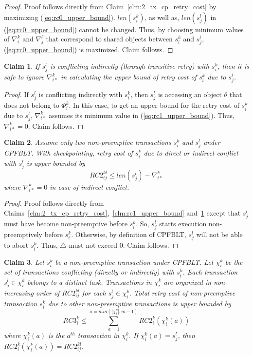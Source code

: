 \documentclass[preprint]{sigplanconf}
\newtheorem{clm}{Claim}
\begin{document}
%
\begin{proof}
%
Proof follows directly from Claim~\ref{clm:2_tx_cp_retry_cost} by maximizing (\ref{eq:rc0_upper_bound}). $len\left(s_i^k\right)$, as well as, $len\left(s_j^l\right)$ in (\ref{eq:rc0_upper_bound}) cannot be changed. Thus, by choosing minimum values of $\nabla_i^k$ and $\nabla_j^l$ that correspond to shared objects between $s_i^k$ and $s_j^l$, (\ref{eq:rc0_upper_bound}) is maximized. Claim follows.
%
\end{proof}
%
\begin{clm}\label{clm:cp_with_transitive_retry}
If $s_j^l$ is conflicting indirectly (through transitive retry) with $s_i^k$, then it is safe to ignore $\nabla_{i*}^k$ in calculating the upper bound of retry cost of $s_i^k$ due to $s_j^l$.
\end{clm}
%
\begin{proof}
If $s_j^l$ is conflicting indirectly with $s_i^k$, then $s_j^l$ is accessing an object $\theta$ that does not belong to $\Phi_i^k$. In this case, to get an upper bound for the retry cost of $s_i^k$ due to $s_j^l$, $\nabla_{i*}^k$ assumes its minimum value in (\ref{eq:rc1_upper_bound}). Thus, $\nabla_{i*}^k=0$. Claim follows.
\end{proof}
%
\begin{clm}\label{clm:non_preemptive_2tx_cpfblt_rc}
Assume only two non-preemptive transactions $s_i^k$ and $s_j^l$ under CPFBLT. With checkpointing, retry cost of $s_i^k$ due to direct or indirect conflict with $s_j^l$ is upper bounded by 
%
\begin{equation}
RC2_{ij}^{kl} \le len\left(s_{j}^{l}\right)-\nabla_{i*}^{k}\label{eq:rc2_upper_bound}
\end{equation}
%
where $\nabla_{i*}^k=0$ in case of indirect conflict.
%
\end{clm}
%
\begin{proof}
Proof follows directly from Claims~\ref{clm:2_tx_cp_retry_cost},~\ref{clm:rc1_upper_bound} and~\ref{clm:cp_with_transitive_retry} except that $s_j^l$ must have become non-preemptive before $s_i^k$. So, $s_j^l$ starts execution non-preemptively before $s_i^k$. Otherwise, by definition of CPFBLT, $s_j^l$ will not be able to abort $s_i^k$. Thus, $\triangle$ must not exceed 0. Claim follows.
\end{proof}
%
\begin{clm}\label{clm:non_preemptive_all_tx_rc}
Let $s_i^k$ be a non-preemptive transaction under CPFBLT. Let $\chi_i^k$ be the set of transactions conflicting (directly or indirectly) with $s_i^k$. Each transaction $s_j^l \in \chi_i^k$ belongs to a distinct task. Transactions in $\chi_i^k$ are organized in non-increasing order of $RC2_{ij}^{kl}$ for each $s_j^l \in \chi_i^k$. Total retry cost of non-preemptive transaction $s_i^k$ due to other non-preemptive transactions is upper bounded by 
%
\begin{equation}
RC3_i^k \le \sum_{a=1}^{a=min\left(|\chi_i^k|, m-1\right)} RC2_i^k\left(\chi_i^k(a)\right)
\label{eq:non_preemptive_all_tx_rc}
\end{equation}
%
where $\chi_i^k(a)$ is the $a^{th}$ transaction in $\chi_i^k$. If $\chi_i^k(a)=s_j^l$, then $RC2_i^k\left(\chi_i^k(a)\right)=RC2_{ij}^{kl}$.
%
\end{clm}
\end{document}
